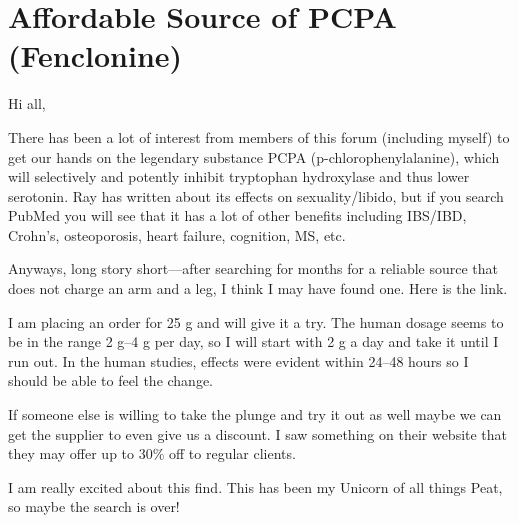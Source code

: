 \chapter{Affordable Source of PCPA (Fenclonine)}

\begin{refsection}

Hi all,

There has been a lot of interest from members of this forum (including myself) to get our hands on the legendary substance PCPA (p-chlorophenylalanine), which will selectively and potently inhibit tryptophan hydroxylase and thus lower serotonin. Ray has written about its effects on sexuality/libido, but if you search PubMed you will see that it has a lot of other benefits including IBS/IBD, Crohn's, osteoporosis, heart failure, cognition, MS, etc.

Anyways, long story short---after searching for months for a reliable source that does not charge an arm and a leg, I think I may have found one. Here is the link.\textsuperscript{\cite{url834e860b}}

I am placing an order for 25 g and will give it a try. The human dosage seems to be in the range 2 g--4 g per day, so I will start with 2 g a day and take it until I run out. In the human studies, effects were evident within 24--48 hours so I should be able to feel the change.

If someone else is willing to take the plunge and try it out as well maybe we can get the supplier to even give us a discount. I saw something on their website that they may offer up to 30\% off to regular clients.

I am really excited about this find. This has been my Unicorn of all things Peat, so maybe the search is over!

\printbibliography[heading=subbibliography]

\end{refsection}